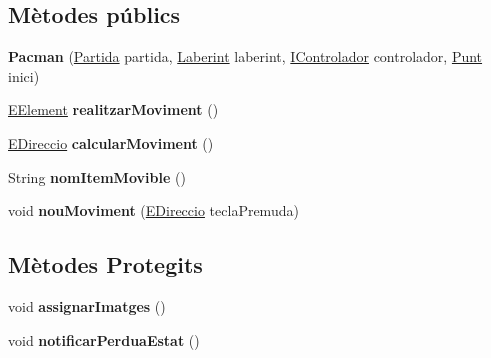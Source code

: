 \subsection*{Mètodes públics}
\begin{DoxyCompactItemize}
\item 
\hypertarget{classlogica_1_1_pacman_a4c8cd3d9c43aba9d2a944af0afe74ac2}{{\bfseries Pacman} (\hyperlink{classlogica_1_1_partida}{Partida} partida, \hyperlink{classlogica_1_1laberints_1_1_laberint}{Laberint} laberint, \hyperlink{interfacelogica_1_1controladors__pacman_1_1_i_controlador}{I\+Controlador} controlador, \hyperlink{classlogica_1_1_punt}{Punt} inici)}\label{classlogica_1_1_pacman_a4c8cd3d9c43aba9d2a944af0afe74ac2}

\item 
\hypertarget{classlogica_1_1_pacman_aa93e730a6089b7670e3b4b20944a7893}{\hyperlink{enumlogica_1_1enumeracions_1_1_e_element}{E\+Element} {\bfseries realitzar\+Moviment} ()}\label{classlogica_1_1_pacman_aa93e730a6089b7670e3b4b20944a7893}

\item 
\hypertarget{classlogica_1_1_pacman_a4aed3d640e73f08aa1183f9c07b8fc13}{\hyperlink{enumlogica_1_1enumeracions_1_1_e_direccio}{E\+Direccio} {\bfseries calcular\+Moviment} ()}\label{classlogica_1_1_pacman_a4aed3d640e73f08aa1183f9c07b8fc13}

\item 
\hypertarget{classlogica_1_1_pacman_a647d372ea38d2eb89e2be24277c70f6a}{String {\bfseries nom\+Item\+Movible} ()}\label{classlogica_1_1_pacman_a647d372ea38d2eb89e2be24277c70f6a}

\item 
\hypertarget{classlogica_1_1_pacman_afc0767e7c2123f103f25947bc90775f0}{void {\bfseries nou\+Moviment} (\hyperlink{enumlogica_1_1enumeracions_1_1_e_direccio}{E\+Direccio} tecla\+Premuda)}\label{classlogica_1_1_pacman_afc0767e7c2123f103f25947bc90775f0}

\end{DoxyCompactItemize}
\subsection*{Mètodes Protegits}
\begin{DoxyCompactItemize}
\item 
\hypertarget{classlogica_1_1_pacman_aa380057c9914d883c00e84356ce71f45}{void {\bfseries assignar\+Imatges} ()}\label{classlogica_1_1_pacman_aa380057c9914d883c00e84356ce71f45}

\item 
\hypertarget{classlogica_1_1_pacman_a7b61e5651dd8bbcbc48f869a66c75013}{void {\bfseries notificar\+Perdua\+Estat} ()}\label{classlogica_1_1_pacman_a7b61e5651dd8bbcbc48f869a66c75013}

\end{DoxyCompactItemize}
